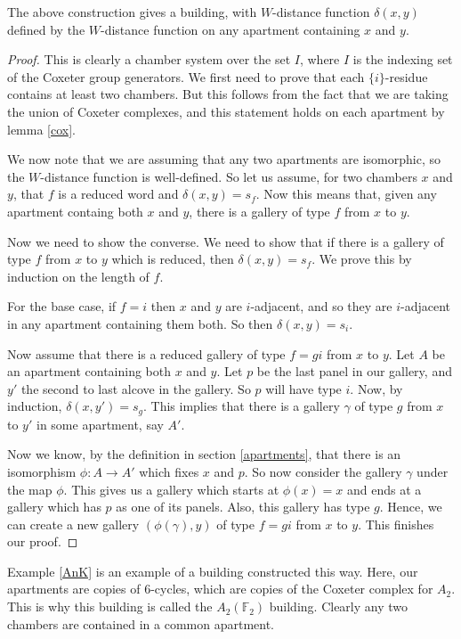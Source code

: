 \documentclass[11pt]{article}
\begin{document}
\begin{theorem}
    The above construction gives a building, with $W$-distance function $\delta(x,y)$ defined by the $W$-distance function on any apartment containing $x$ and $y$. 
\end{theorem}

\begin{proof}
    This is clearly a chamber system over the set $I$, where $I$ is the indexing set of the Coxeter group generators. We first need to prove that each $\{i\}$-residue contains at least two chambers. But this follows from the fact that we are taking the union of Coxeter complexes, and this statement holds on each apartment by lemma \ref{cox}. 

    We now note that we are assuming that any two apartments are isomorphic, so the $W$-distance function is well-defined. So let us assume, for two chambers $x$ and $y$, that $f$ is a reduced word and $\delta(x,y)=s_f$. Now this means that, given any apartment containg both $x$ and $y$, there is a gallery of type $f$ from $x$ to $y$. 

    Now we need to show the converse. We need to show that if there is a gallery of type $f$ from $x$ to $y$ which is reduced, then $\delta(x,y)=s_f$. We prove this by induction on the length of $f$. 

    For the base case, if $f=i$ then $x$ and $y$ are $i$-adjacent, and so they are $i$-adjacent in any apartment containing them both. So then $\delta(x,y)=s_i$.

    Now assume that there is a reduced gallery of type $f=gi$ from $x$ to $y$. Let $A$ be an apartment containing both $x$ and $y$. Let $p$ be the last panel in our gallery, and $y'$ the second to last alcove in the gallery. So $p$ will have type $i$. Now, by induction, $\delta(x,y')=s_g$. This implies that there is a gallery $\gamma$ of type $g$ from $x$ to $y'$ in some apartment, say $A'$.
    
    Now we know, by the definition in section \ref{apartments}, that there is an isomorphism $\phi : A\to A'$ which fixes $x$ and $p$. So now consider the gallery $\gamma$ under the map $\phi$. This gives us a gallery which starts at $\phi(x)=x$ and ends at a gallery which has $p$ as one of its panels. Also, this gallery has type $g$. Hence, we can create a new gallery $(\phi(\gamma),y)$ of type $f=gi$ from $x$ to $y$. This finishes our proof.
\end{proof}


\begin{example}
    Example \ref{AnK} is an example of a building constructed this way. Here, our apartments are copies of 6-cycles, which are copies of the Coxeter complex for $A_2$. This is why this building is called the $A_2(\mathbb{F}_2)$ building. Clearly any two chambers are contained in a common apartment. 
\end{example}
\end{document}
